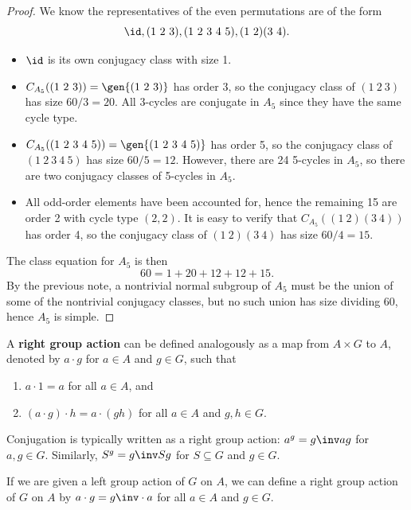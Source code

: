 \theo[$A_5$ is Simple] \label{theo4.12}
\begin{proof}
    We know the representatives of the even permutations are of the form
    \[\id, (1\ 2\ 3), (1\ 2\ 3\ 4\ 5), (1\ 2)(3\ 4).\]
    \begin{itemize}
        \item $\id$ is its own conjugacy class with size 1.
        \item $C_{A_5}((1\ 2\ 3)) = \gen{(1\ 2\ 3)}$ has order 3, so the conjugacy class of $(1\ 2\ 3)$ has size $60/3 = 20$. All 3-cycles are conjugate in $A_5$ since they have the same cycle type.
        \item $C_{A_5}((1\ 2\ 3\ 4\ 5)) = \gen{(1\ 2\ 3\ 4\ 5)}$ has order 5, so the conjugacy class of $(1\ 2\ 3\ 4\ 5)$ has size $60/5 = 12$. However, there are 24 5-cycles in $A_5$, so there are two conjugacy classes of 5-cycles in $A_5$.
        \item All odd-order elements have been accounted for, hence the remaining 15 are order 2 with cycle type $(2, 2)$. It is easy to verify that $C_{A_5}((1\ 2)(3\ 4))$ has order 4, so the conjugacy class of $(1\ 2)(3\ 4)$ has size $60/4 = 15$.
    \end{itemize}
    The class equation for $A_5$ is then
    \[60 = 1 + 20 + 12 + 12 + 15.\]
    By the previous note, a nontrivial normal subgroup of $A_5$ must be the union of some of the nontrivial conjugacy classes, but no such union has size dividing 60, hence $A_5$ is simple.
\end{proof}

 A \textbf{right group action} can be defined analogously as a map from $A \times G$ to $A$, denoted by $a \cdot g$ for $a \in A$ and $g \in G$, such that
\begin{enumerate}
    \item $a \cdot 1 = a$ for all $a \in A$, and
    \item $(a \cdot g) \cdot h = a \cdot (gh)$ for all $a \in A$ and $g, h \in G$.
\end{enumerate}

\note Conjugation is typically written as a right group action: $a^g = g\inv a g$ for $a, g \in G$. Similarly, $S^g = g\inv S g$ for $S \subseteq G$ and $g \in G$.

\note If we are given a left group action of $G$ on $A$, we can define a right group action of $G$ on $A$ by $a \cdot g = g\inv \cdot a$ for all $a \in A$ and $g \in G$.

\newpage

